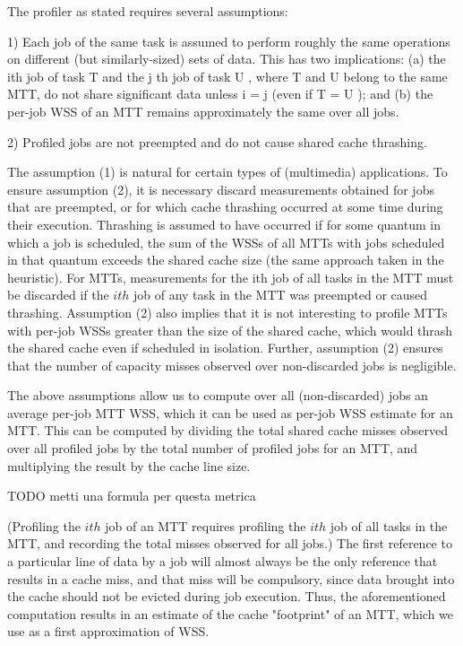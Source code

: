 \documentclass[a4paper,10pt]{article}
\begin{document}
\begin{multicols}{2}
The profiler as stated requires several assumptions:
 
1) Each job of the same task is assumed to perform roughly the same operations on different (but similarly-sized) sets of data.
This has two implications: (a) the ith job of task T and the j th job of task U , where T and U belong to the same MTT, do not share
significant data unless i = j (even if T = U ); and (b) the per-job WSS of an MTT remains approximately the same over all jobs.

2) Profiled jobs are not preempted and do not cause shared cache thrashing.

The assumption (1) is natural for certain types of (multimedia) applications. To ensure assumption (2), it is necessary discard measurements obtained 
for jobs that are preempted, or for which cache thrashing occurred at some time during their execution. Thrashing is assumed to have occurred if for some
quantum in which a job is scheduled, the sum of the WSSs of all MTTs with jobs scheduled in that quantum exceeds the
shared cache size (the same approach taken in the heuristic). For MTTs, measurements for the ith job of all tasks in the
MTT must be discarded if the $ith$ job of any task in the MTT was preempted or caused thrashing. Assumption (2) also implies that it is not interesting to 
profile MTTs with per-job WSSs greater than the size of the shared cache, which would thrash the shared cache even if scheduled in isolation.
Further, assumption (2) ensures that the number of capacity misses observed over non-discarded jobs is negligible.

The above assumptions allow us to compute over all (non-discarded) jobs an average per-job MTT WSS, which it can be used as per-job WSS estimate for
an MTT. This can be computed by dividing the total shared cache misses observed over all profiled jobs by the total number of profiled jobs for an MTT, 
and multiplying the result by the cache line size. 

TODO metti una formula per questa metrica

(Profiling the $ith$ job of an MTT requires profiling the $ith$ job of all tasks in the MTT, and
recording the total misses observed for all jobs.) The first reference to a particular line of data by a job will almost always be the only reference
that results in a cache miss, and that miss will be compulsory, since data brought into the cache should not be evicted during job execution.
Thus, the aforementioned computation results in an estimate of the cache "footprint" of an MTT, which we use as a first approximation of WSS.


\end{multicols}
\end{document}
